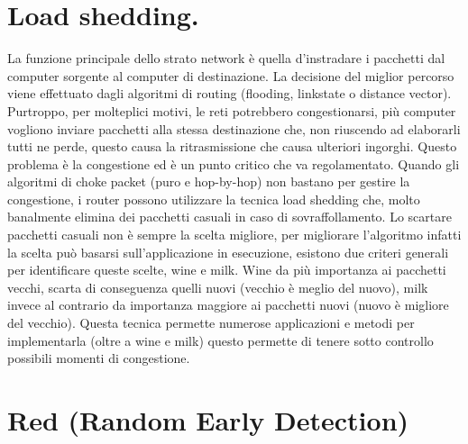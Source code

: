 \section{Load shedding.}

La funzione principale dello strato network è quella d’instradare i pacchetti dal computer sorgente al computer di destinazione. La decisione del miglior percorso viene effettuato dagli algoritmi di routing (flooding, linkstate o distance vector). Purtroppo, per molteplici motivi, le reti potrebbero congestionarsi, più computer vogliono inviare pacchetti alla stessa destinazione che, non riuscendo ad elaborarli tutti ne perde, questo causa la ritrasmissione che causa ulteriori ingorghi. Questo problema è la congestione ed è un punto critico che va regolamentato.
Quando gli algoritmi di choke packet (puro e hop-by-hop) non bastano per gestire la congestione, i router possono utilizzare la tecnica load shedding che, molto banalmente elimina dei pacchetti casuali in caso di sovraffollamento.
Lo scartare pacchetti casuali non è sempre la scelta migliore, per migliorare l’algoritmo infatti la scelta può basarsi sull’applicazione in esecuzione, esistono due criteri generali per identificare queste scelte, wine e milk.
Wine da più importanza ai pacchetti vecchi, scarta di conseguenza quelli nuovi (vecchio è meglio del nuovo), milk invece al contrario da importanza maggiore ai pacchetti nuovi (nuovo è migliore del vecchio).
Questa tecnica permette numerose applicazioni e metodi per implementarla (oltre a wine e milk) questo permette di tenere sotto controllo possibili momenti di congestione.

\section{Red (Random Early Detection)}

